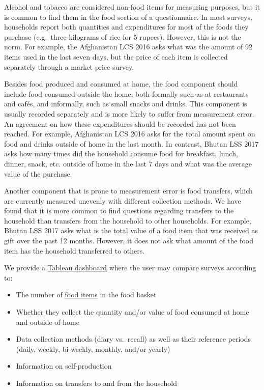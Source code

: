 \documentclass[13 pt,]{book}
\providecommand{\tightlist}{%
  \setlength{\itemsep}{0pt}\setlength{\parskip}{0pt}}
\begin{document}
Alcohol and tobacco are considered non-food items for measuring
purposes, but it is common to find them in the food section of a
questionnaire. In most surveys, households report both quantities and
expenditures for most of the foods they purchase (e.g.~three kilograms
of rice for 5 rupees). However, this is not the norm. For example, the
Afghanistan LCS 2016 asks what was the amount of 92 items used in the
last seven days, but the price of each item is collected separately
through a market price survey.

Besides food produced and consumed at home, the food component should
include food consumed outside the home, both formally such as at
restaurants and cafés, and informally, such as small snacks and drinks.
This component is usually recorded separately and is more likely to
suffer from measurement error. An agreement on how these expenditures
should be recorded has not been reached. For example, Afghanistan LCS
2016 asks for the total amount spent on food and drinks outside of home
in the last month. In contrast, Bhutan LSS 2017 asks how many times did
the household consume food for breakfast, lunch, dinner, snack, etc.
outside of home in the last 7 days and what was the average value of the
purchase.

Another component that is prone to measurement error is food transfers,
which are currently measured unevenly with different collection methods.
We have found that it is more common to find questions regarding
transfers to the household than transfers from the household to other
households. For example, Bhutan LSS 2017 asks what is the total value of
a food item that was received as gift over the past 12 months. However,
it does not ask what amount of the food item has the household
transferred to others.

We provide a
\href{https://tab.worldbank.org/\#/site/WBG/views/SAR_MNA_Metadata/Food}{Tableau
dashboard} where the user may compare surveys according to:

\begin{itemize}
\tightlist
\item
  The number of
  \href{https://tab.worldbank.org/\#/site/WBG/views/SAR_MNA_Metadata/Items}{food
  items} in the food basket
\item
  Whether they collect the quantity and/or value of food consumed at
  home and outside of home
\item
  Data collection methods (diary vs.~recall) as well as their reference
  periods (daily, weekly, bi-weekly, monthly, and/or yearly)
\item
  Information on self-production
\item
  Information on transfers to and from the household
\end{itemize}
\end{document}
